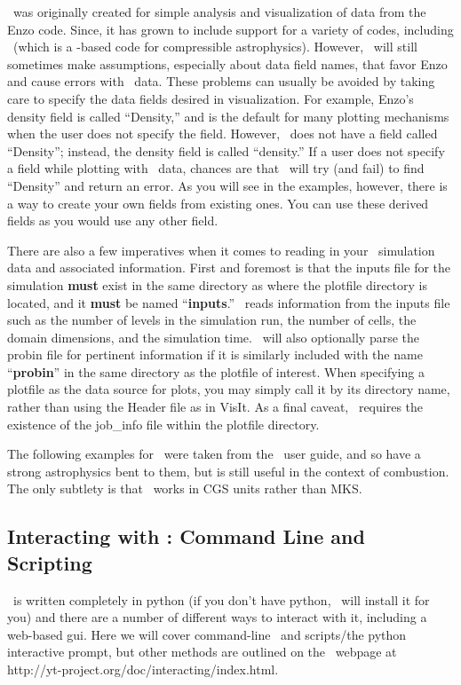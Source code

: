 \yt\ was originally created for simple analysis and visualization of
data from the Enzo code. Since, it has grown to include support for a
variety of codes, including \castro\ (which is a \amrex-based code
for compressible astrophysics). However, \yt\ will still sometimes
make assumptions, especially about data field names, that favor Enzo
and cause errors with \amrex\ data. These problems can usually be
avoided by taking care to specify the data fields desired in
visualization. For example, Enzo's density field is called
``Density,'' and is the default for many plotting mechanisms when the
user does not specify the field. However, \iamr\ does not have a field
called ``Density''; instead, the density field is called ``density.''
If a user does not specify a field while plotting with \iamr\ data,
chances are that \yt\ will try (and fail) to find ``Density'' and return
an error. As you will see in the examples, however, there is a way to
create your own fields from existing ones. You can use these derived
fields as you would use any other field.

There are also a few imperatives when it comes to reading in your
\amrex\ simulation data and associated information. First and foremost
is that the inputs file for the simulation {\bf must} exist in the
same directory as where the plotfile directory is located, and it {\bf
  must} be named ``{\bf inputs}.'' \yt\ reads information from the
inputs file such as the number of levels in the simulation run, the
number of cells, the domain dimensions, and the simulation time. \yt\
will also optionally parse the probin file for pertinent information
if it is similarly included with the name ``{\bf probin}'' in the same
directory as the plotfile of interest. When specifying a plotfile as
the data source for plots, you may simply call it by its directory
name, rather than using the Header file as in VisIt. As a final
caveat, \yt\ requires the existence of the job\_info file within the plotfile
directory.

The following examples for \yt\ were taken from the \castro\ user guide,
and so have a strong astrophysics bent to them, but is still useful
in the context of combustion.  The only subtlety is that \castro\ 
works in CGS units rather than MKS.

\subsection{Interacting with \yt: Command Line and Scripting}

\yt\ is written completely in python (if you don't have python, \yt\ will
install it for you) and there are a number of different ways to
interact with it, including a web-based gui. Here we will cover
command-line \yt\ and scripts/the python interactive prompt, but other
methods are outlined on the \yt\ webpage at
http://yt-project.org/doc/interacting/index.html.

